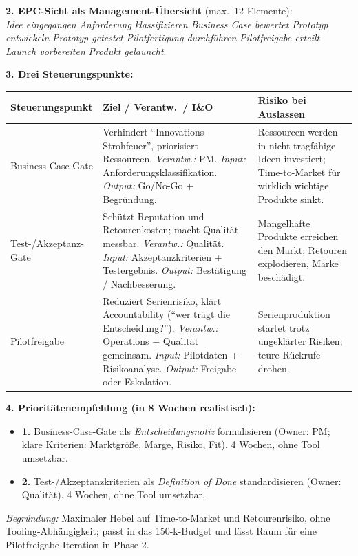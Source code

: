\documentclass[11pt,a4paper,oneside]{article}
\begin{document}
\begin{loesungbox}
\smallskip
\textbf{2. EPC-Sicht als Management-\"Ubersicht} (max.\ 12 Elemente):\\
\emph{Idee eingegangen} \textrightarrow{} \emph{Anforderung klassifizieren} \textrightarrow{} \emph{Business Case bewertet} \textrightarrow{} \emph{Prototyp entwickeln} \textrightarrow{} \emph{Prototyp getestet} \textrightarrow{} \emph{Pilotfertigung durchf\"uhren} \textrightarrow{} \emph{Pilotfreigabe erteilt} \textrightarrow{} \emph{Launch vorbereiten} \textrightarrow{} \emph{Produkt gelauncht}.

\smallskip
\textbf{3. Drei Steuerungspunkte:}

\smallskip
\begin{tabularx}{\linewidth}{@{}p{3.4cm}XX@{}}
\toprule
\textbf{Steuerungspunkt} & \textbf{Ziel / Verantw.\ / I\&O} & \textbf{Risiko bei Auslassen} \\
\midrule
Business-Case-Gate & Verhindert ``Innovations-Strohfeuer'', priorisiert Ressourcen. \emph{Verantw.:} PM. \emph{Input:} Anforderungsklassifikation. \emph{Output:} Go/No-Go + Begr\"undung. & Ressourcen werden in nicht-tragf\"ahige Ideen investiert; Time-to-Market f\"ur wirklich wichtige Produkte sinkt. \\
\midrule
Test-/Akzeptanz-Gate & Sch\"utzt Reputation und Retourenkosten; macht Qualit\"at messbar. \emph{Verantw.:} Qualit\"at. \emph{Input:} Akzeptanzkriterien + Testergebnis. \emph{Output:} Best\"atigung / Nachbesserung. & Mangelhafte Produkte erreichen den Markt; Retouren explodieren, Marke besch\"adigt. \\
\midrule
Pilotfreigabe & Reduziert Serienrisiko, kl\"art Accountability (``wer tr\"agt die Entscheidung?''). \emph{Verantw.:} Operations + Qualit\"at gemeinsam. \emph{Input:} Pilotdaten + Risikoanalyse. \emph{Output:} Freigabe oder Eskalation. & Serienproduktion startet trotz ungekl\"arter Risiken; teure R\"uckrufe drohen. \\
\bottomrule
\end{tabularx}

\smallskip
\textbf{4. Priorit\"atenempfehlung (in 8 Wochen realistisch):}
\begin{itemize}
  \item \textbf{1.} Business-Case-Gate als \emph{Entscheidungsnotiz} formalisieren (Owner: PM; klare Kriterien: Marktgr\"o{\ss}e, Marge, Risiko, Fit). 4 Wochen, ohne Tool umsetzbar.
  \item \textbf{2.} Test-/Akzeptanzkriterien als \emph{Definition of Done} standardisieren (Owner: Qualit\"at). 4 Wochen, ohne Tool umsetzbar.
\end{itemize}
\emph{Begr\"undung:} Maximaler Hebel auf Time-to-Market und Retourenrisiko, ohne Tooling-Abh\"angigkeit; passt in das 150-k-Budget und l\"asst Raum f\"ur eine Pilotfreigabe-Iteration in Phase 2.
\end{loesungbox}
\end{document}
